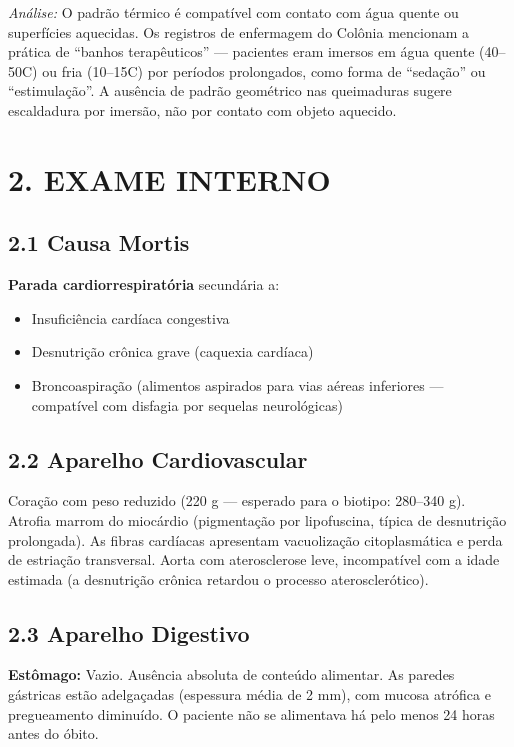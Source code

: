 \textit{Análise:} O padrão térmico é compatível com contato com água quente ou superfícies aquecidas. Os registros de enfermagem do Colônia mencionam a prática de ``banhos terapêuticos'' --- pacientes eram imersos em água quente (40--50\textdegree C) ou fria (10--15\textdegree C) por períodos prolongados, como forma de ``sedação'' ou ``estimulação''. A ausência de padrão geométrico nas queimaduras sugere escaldadura por imersão, não por contato com objeto aquecido.

\vspace{1em}
\section*{2. EXAME INTERNO}

\subsection*{2.1 Causa Mortis}

\textbf{Parada cardiorrespiratória} secundária a:
\begin{itemize}
    \item Insuficiência cardíaca congestiva
    \item Desnutrição crônica grave (caquexia cardíaca)
    \item Broncoaspiração (alimentos aspirados para vias aéreas inferiores --- compatível com disfagia por sequelas neurológicas)
\end{itemize}

\subsection*{2.2 Aparelho Cardiovascular}

Coração com peso reduzido (220 g --- esperado para o biotipo: 280–340 g). Atrofia marrom do miocárdio (pigmentação por lipofuscina, típica de desnutrição prolongada). As fibras cardíacas apresentam vacuolização citoplasmática e perda de estriação transversal. Aorta com aterosclerose leve, incompatível com a idade estimada (a desnutrição crônica retardou o processo aterosclerótico).

\subsection*{2.3 Aparelho Digestivo}

\textbf{Estômago:} Vazio. Ausência absoluta de conteúdo alimentar. As paredes gástricas estão adelgaçadas (espessura média de 2 mm), com mucosa atrófica e pregueamento diminuído. O paciente não se alimentava há pelo menos 24 horas antes do óbito.

